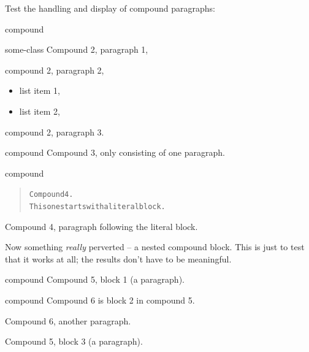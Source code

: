 \documentclass[a4paper]{article}
\begin{document}
Test the handling and display of compound paragraphs:

\begin{DUclass}{compound}
\begin{DUclass}{some-class}
Compound 2, paragraph 1,

compound 2, paragraph 2,
\begin{itemize}
\item list item 1,

\item list item 2,
\end{itemize}
compound 2, paragraph 3.
\end{DUclass}
\end{DUclass}

\begin{DUclass}{compound}
Compound 3, only consisting of one paragraph.
\end{DUclass}

\begin{DUclass}{compound}
\begin{quote}
\begin{alltt}
Compound 4.
This one starts with a literal block.
\end{alltt}
\end{quote}
Compound 4, paragraph following the literal block.
\end{DUclass}

Now something \emph{really} perverted – a nested compound block.  This is
just to test that it works at all; the results don’t have to be
meaningful.

\begin{DUclass}{compound}
Compound 5, block 1 (a paragraph).

\begin{DUclass}{compound}
Compound 6 is block 2 in compound 5.

Compound 6, another paragraph.
\end{DUclass}

Compound 5, block 3 (a paragraph).
\end{DUclass}
\end{document}
